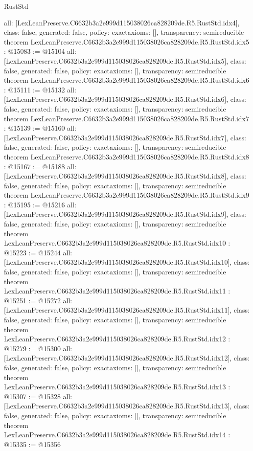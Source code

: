 \begin{lexlean}{RustStd}
\begin{coremodule}
{  all: [LexLeanPreserve.C6632b3a2e999d115038026ca828209de.R5.RustStd.idx4],
  class: false,
  generated: false,
  policy: exact{axioms: []},
  transparency: semireducible
}
theorem LexLeanPreserve.C6632b3a2e999d115038026ca828209de.R5.RustStd.idx5 : @15083 := @15104 {
  all: [LexLeanPreserve.C6632b3a2e999d115038026ca828209de.R5.RustStd.idx5],
  class: false,
  generated: false,
  policy: exact{axioms: []},
  transparency: semireducible
}
theorem LexLeanPreserve.C6632b3a2e999d115038026ca828209de.R5.RustStd.idx6 : @15111 := @15132 {
  all: [LexLeanPreserve.C6632b3a2e999d115038026ca828209de.R5.RustStd.idx6],
  class: false,
  generated: false,
  policy: exact{axioms: []},
  transparency: semireducible
}
theorem LexLeanPreserve.C6632b3a2e999d115038026ca828209de.R5.RustStd.idx7 : @15139 := @15160 {
  all: [LexLeanPreserve.C6632b3a2e999d115038026ca828209de.R5.RustStd.idx7],
  class: false,
  generated: false,
  policy: exact{axioms: []},
  transparency: semireducible
}
theorem LexLeanPreserve.C6632b3a2e999d115038026ca828209de.R5.RustStd.idx8 : @15167 := @15188 {
  all: [LexLeanPreserve.C6632b3a2e999d115038026ca828209de.R5.RustStd.idx8],
  class: false,
  generated: false,
  policy: exact{axioms: []},
  transparency: semireducible
}
theorem LexLeanPreserve.C6632b3a2e999d115038026ca828209de.R5.RustStd.idx9 : @15195 := @15216 {
  all: [LexLeanPreserve.C6632b3a2e999d115038026ca828209de.R5.RustStd.idx9],
  class: false,
  generated: false,
  policy: exact{axioms: []},
  transparency: semireducible
}
theorem LexLeanPreserve.C6632b3a2e999d115038026ca828209de.R5.RustStd.idx10 : @15223 := @15244 {
  all: [LexLeanPreserve.C6632b3a2e999d115038026ca828209de.R5.RustStd.idx10],
  class: false,
  generated: false,
  policy: exact{axioms: []},
  transparency: semireducible
}
theorem LexLeanPreserve.C6632b3a2e999d115038026ca828209de.R5.RustStd.idx11 : @15251 := @15272 {
  all: [LexLeanPreserve.C6632b3a2e999d115038026ca828209de.R5.RustStd.idx11],
  class: false,
  generated: false,
  policy: exact{axioms: []},
  transparency: semireducible
}
theorem LexLeanPreserve.C6632b3a2e999d115038026ca828209de.R5.RustStd.idx12 : @15279 := @15300 {
  all: [LexLeanPreserve.C6632b3a2e999d115038026ca828209de.R5.RustStd.idx12],
  class: false,
  generated: false,
  policy: exact{axioms: []},
  transparency: semireducible
}
theorem LexLeanPreserve.C6632b3a2e999d115038026ca828209de.R5.RustStd.idx13 : @15307 := @15328 {
  all: [LexLeanPreserve.C6632b3a2e999d115038026ca828209de.R5.RustStd.idx13],
  class: false,
  generated: false,
  policy: exact{axioms: []},
  transparency: semireducible
}
theorem LexLeanPreserve.C6632b3a2e999d115038026ca828209de.R5.RustStd.idx14 : @15335 := @15356 {
}
\end{coremodule}
\end{lexlean}
